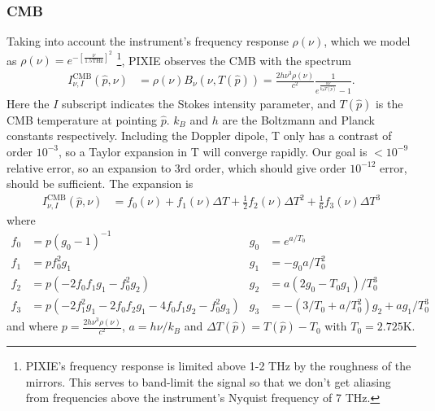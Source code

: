 \documentclass{article}
\begin{document}
\subsubsection{CMB}
\label{sect:cmb}
Taking into account the instrument's frequency response $\rho(\nu)$, which
we model as $\rho(\nu) = e^{-\left[\frac{\nu}{1.5\textrm{THz}}\right]^2}$
\footnote{PIXIE's frequency response is limited above 1-2 THz by the
roughness of the mirrors. This serves to band-limit the signal
so that we don't get aliasing from frequencies above the instrument's
Nyquist frequency of 7 THz.}, PIXIE
observes the CMB with the spectrum
\begin{align}
I^\textrm{CMB}_{\nu,I}(\hat p, \nu) &= \rho(\nu)B_\nu(\nu, T(\hat p)) = \frac{2h\nu^3\rho(\nu)}{c^2}\frac{1}{e^{\frac{h\nu}{k_BT(\hat p)}} - 1}.
\end{align}
Here the $I$ subscript indicates the Stokes intensity parameter, and $T(\hat p)$ is the
CMB temperature at pointing $\hat p$. $k_B$ and $h$ are the Boltzmann and Planck constants
respectively.
Including the Doppler dipole, T only has a contrast of order $10^{-3}$, so a Taylor
expansion in T will converge rapidly. Our goal is $<10^{-9}$ relative error, so an
expansion to 3rd order, which should give order $10^{-12}$ error, should be sufficient.
The expansion is
\begin{align}
	I^\textrm{CMB}_{\nu,I}(\hat p, \nu) &= f_0(\nu) + f_1(\nu) \Delta T + \frac12 f_2(\nu) \Delta T^2 + \frac16 f_3(\nu) \Delta T^3
\end{align}
where
\begin{align*}
	f_0 &= p(g_0-1)^{-1}    & g_0 &= e^{a/T_0} \\
	f_1 &= pf_0^2 g_1       & g_1 &= -g_0 a/T_0^2 \\
	f_2 &= p(-2 f_0 f_1 g_1 - f_0^2 g_2) &
	g_2 &= a(2 g_0-T_0 g_1)/T_0^3 \\
	f_3 &= p(-2 f_1^2 g_1 - 2f_0 f_2 g_1 - 4 f_0 f_1 g_2 - f_0^2 g_3) &
	g_3 &= -(3/T_0 + a/T_0^2)g_2 + a g_1/T_0^3
\end{align*}
and where $p = \frac{2h\nu^3\rho(\nu)}{c^2}$, $a = h\nu/k_B$ and $\Delta T(\hat p) = T(\hat p)-T_0$ with $T_0 = 2.725$K. 
\end{document}
